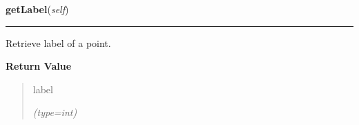     \label{gblfit:GblPoint:getLabel}

    \vspace{0.5ex}

\hspace{.8\funcindent}\begin{boxedminipage}{\funcwidth}

    \raggedright \textbf{getLabel}(\textit{self})

    \vspace{-1.5ex}

    \rule{\textwidth}{0.5\fboxrule}
\setlength{\parskip}{2ex}
    Retrieve label of a point.

\setlength{\parskip}{1ex}
      \textbf{Return Value}
    \vspace{-1ex}

      \begin{quote}
      label

      {\it (type=int)}

      \end{quote}

    \end{boxedminipage}

    \label{gblfit:GblPoint:setOffset}

    \vspace{0.5ex}


